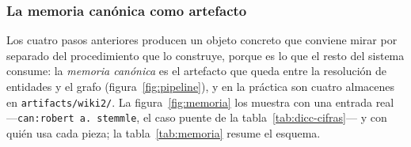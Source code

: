 \documentclass[11pt,a4paper]{article}
\begin{document}
\subsubsection{La memoria canónica como artefacto}
\label{sec:memoria}

Los cuatro pasos anteriores producen un objeto concreto que conviene mirar
por separado del procedimiento que lo construye, porque es lo que el resto
del sistema consume: la \emph{memoria canónica} es el artefacto que queda
entre la resolución de entidades y el grafo (figura~\ref{fig:pipeline}), y
en la práctica son cuatro almacenes en \texttt{artifacts/wiki2/}. La
figura~\ref{fig:memoria} los muestra con una entrada real
---\texttt{can:robert a. stemmle}, el caso puente de la
tabla~\ref{tab:dicc-cifras}--- y con quién usa cada pieza; la
tabla~\ref{tab:memoria} resume el esquema.
\end{document}
